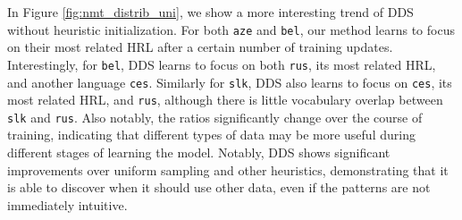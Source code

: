 In Figure \ref{fig:nmt_distrib_uni}, we show a more interesting trend of DDS without heuristic initialization.
For both \texttt{aze} and \texttt{bel}, our method learns to focus on their most related HRL after a certain number of training updates.
Interestingly, for \texttt{bel}, DDS learns to focus on both \texttt{rus}, its most related HRL, and another language \texttt{ces}. Similarly for \texttt{slk}, DDS also learns to focus on \texttt{ces}, its most related HRL, and \texttt{rus}, although there is little vocabulary overlap between \texttt{slk} and \texttt{rus}.
Also notably, the ratios significantly change over the course of training, indicating that different types of data may be more useful during different stages of learning the model.
Notably, DDS shows significant improvements over uniform sampling and other heuristics, demonstrating that it is able to discover when it should use other data, even if the patterns are not immediately intuitive.
